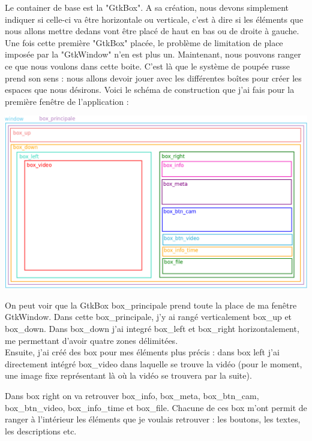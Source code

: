 \documentclass[11pt,french,a4paper]{report}
\begin{document}
Le container de base est la "GtkBox". A sa création, nous devons simplement indiquer si celle-ci va être horizontale ou verticale, 
c'est à dire si les éléments que nous allons mettre dedans vont être placé de haut en bas ou de droite à gauche. 
Une fois cette première "GtkBox" placée, le problème de limitation de place imposée par la "GtkWindow" n'en est plus un. 
Maintenant, nous pouvons ranger ce que nous voulons dans cette boite. C'est là que le système de poupée russe prend son sens : 
nous allons devoir jouer avec les différentes boîtes pour créer les espaces que nous désirons. Voici le schéma de construction 
que j'ai fais pour la première fenêtre de l'application : \\
\begin{center}
\includegraphics[scale=0.5]{../images/dia/schema_bloc_mainwin.png} \\
\end{center}

On peut voir que la GtkBox box\_principale prend toute la place de ma fenêtre GtkWindow. Dans cette box\_principale, j'y ai rangé 
verticalement box\_up et box\_down. Dans box\_down j'ai integré box\_left et box\_right horizontalement, me permettant d'avoir 
quatre zones délimitées. \\
Ensuite, j'ai créé des box pour mes éléments plus précis : dans box left j'ai directement intégré box\_video dans laquelle 
se trouve la vidéo (pour le moment, une image fixe représentant là où la vidéo se trouvera par la suite). 

Dans box right on va retrouver box\_info, box\_meta, box\_btn\_cam, box\_btn\_video, box\_info\_time et box\_file. 
Chacune de ces box m'ont permit de ranger à l'intérieur les éléments que je voulais retrouver : 
les boutons, les textes, les descriptions etc. 
\end{document}
